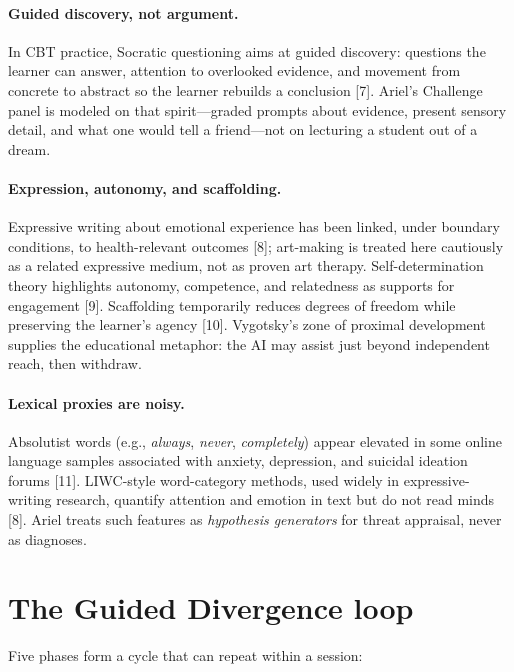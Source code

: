 \documentclass[11pt, a4paper]{article}
\begin{document}
\paragraph{Guided discovery, not argument.}
In CBT practice, Socratic questioning aims at guided discovery: questions the learner can answer, attention to overlooked evidence, and movement from concrete to abstract so the learner rebuilds a conclusion [7]. Ariel’s Challenge panel is modeled on that spirit---graded prompts about evidence, present sensory detail, and what one would tell a friend---not on lecturing a student out of a dream.

\paragraph{Expression, autonomy, and scaffolding.}
Expressive writing about emotional experience has been linked, under boundary conditions, to health-relevant outcomes [8]; art-making is treated here cautiously as a related expressive medium, not as proven art therapy. Self-determination theory highlights autonomy, competence, and relatedness as supports for engagement [9]. Scaffolding temporarily reduces degrees of freedom while preserving the learner's agency [10]. Vygotsky’s zone of proximal development supplies the educational metaphor: the AI may assist just beyond independent reach, then withdraw.

\paragraph{Lexical proxies are noisy.}
Absolutist words (e.g., \emph{always}, \emph{never}, \emph{completely}) appear elevated in some online language samples associated with anxiety, depression, and suicidal ideation forums [11]. LIWC-style word-category methods, used widely in expressive-writing research, quantify attention and emotion in text but do not read minds [8]. Ariel treats such features as \emph{hypothesis generators} for threat appraisal, never as diagnoses.

\section{The Guided Divergence loop}
Five phases form a cycle that can repeat within a session:
\end{document}
